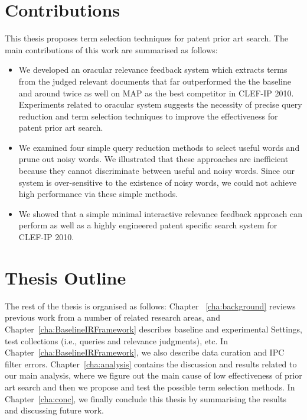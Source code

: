 \section{Contributions}
\label{sec:Contributions}
This thesis proposes term selection techniques for patent prior art search.
The main contributions of this work are summarised as follows:
\begin{itemize}
\item We developed an oracular relevance feedback system which extracts terms from the judged relevant documents that far outperformed the the baseline and around twice as well on MAP as the best competitor in CLEF-IP 2010. Experiments related to oracular system suggests the necessity of precise query reduction and term selection techniques to improve the effectiveness for patent prior art search.
\item We examined four simple query reduction methods to select useful words and prune out noisy words. We illustrated that these approaches are inefficient because they cannot discriminate between useful and noisy words. Since our system is over-sensitive to the existence of noisy words, we could not achieve high performance via these simple methods.
\item We showed that a simple minimal interactive relevance feedback approach can perform as well as a highly engineered patent specific search system for CLEF-IP 2010.
\end{itemize}
\section{Thesis Outline}
\label{sec:outline}
The rest of the thesis is organised as follows: Chapter ~\ref{cha:background} reviews previous work from a number
of related research areas, and Chapter~\ref{cha:BaselineIRFramework} describes baseline and experimental Settings, 
test collections (i.e., queries and relevance judgments),
etc. In Chapter~\ref{cha:BaselineIRFramework}, we also describe data curation and IPC filter errors.
Chapter~\ref{cha:analysis} contains the discussion and results related to our main analysis, where we figure out 
the main cause of low effectiveness of prior art search and then we propose and test the possible term selection methods. 
In Chapter~\ref{cha:conc}, we finally conclude this thesis by 
summarising the results and discussing future work.



